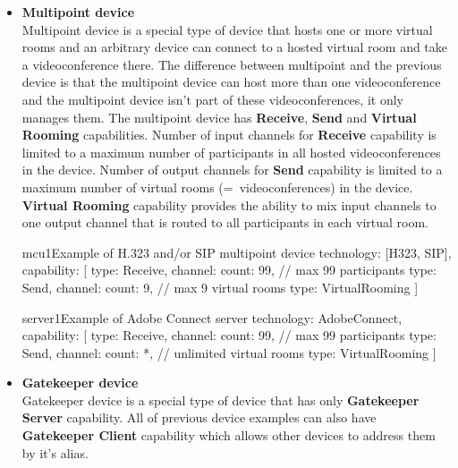 \documentclass[a4paper]{report}
\begin{document}
\begin{itemize}
\begin{TopologyExample}{terminal4}{Example of terminal with one virtual room for H.323 and/or SIP}
technology: [H323, SIP],
capability: [
  {type: Receive, channel: {count: 9}}, // max 9 other participants
  {type: Send, channel: {count: 1}},
  {type: Mix}
]
\end{TopologyExample}

\item \textbf{Multipoint device} \\
  Multipoint device is a special type of device that hosts one or more virtual 
  rooms and an arbitrary device can connect to a hosted virtual room and take 
  a videoconference there. The difference between multipoint and the previous 
  device is that the multipoint device can host more than one videoconference 
  and the multipoint device isn't part of these videoconferences, it only 
  manages them. The multipoint device has \textbf{Receive}, \textbf{Send}
  and \textbf{Virtual Rooming} capabilities. Number of input 
  channels for \textbf{Receive} capability is limited to a maximum number of 
  participants in all hosted videoconferences in the device. Number of output 
  channels for \textbf{Send} capability is limited to a maximum number of 
  virtual rooms (=~videoconferences) in the device. \textbf{Virtual Rooming} 
  capability provides the ability to mix input channels to one output channel 
  that is routed to all participants in each virtual room.

\begin{TopologyExample}{mcu1}{Example of H.323 and/or SIP multipoint device}
technology: [H323, SIP],
capability: [
  {type: Receive, channel: {count: 99}}, // max 99 participants
  {type: Send, channel: {count: 9}},     // max 9 virtual rooms
  {type: VirtualRooming}
]
\end{TopologyExample}

\begin{TopologyExample}{server1}{Example of Adobe Connect server}
technology: AdobeConnect,
capability: [
  {type: Receive, channel: {count: 99}}, // max 99 participants
  {type: Send, channel: {count: *}},     // unlimited virtual rooms
  {type: VirtualRooming}
]
\end{TopologyExample}

\item \textbf{Gatekeeper device} \\
  Gatekeeper device is a special type of device that has only 
  \textbf{Gatekeeper Server} capability. All of previous device examples can 
  also have \textbf{Gatekeeper Client} capability which allows other devices
  to address them by it's alias.
    

\end{itemize}
\end{document}
